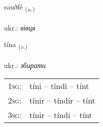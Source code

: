 \documentclass[frontgrid, backgrid]{flacards}\usepackage[]{graphicx}\usepackage[]{xcolor}
\begin{document}
\renewcommand{\flhead}{\vskip5pt \fboxsep=0pt {\small\bfseries\footnotesize Nafnorð | іменник}}
\renewcommand{\fcfoot}{\vskip5pt \fboxsep=0pt \hspace{2pt}{\small\bfseries\footnotesize 3K}}

\renewcommand{\blhead}{\vskip5pt {\small\bfseries\footnotesize Nafnorð | іменник }}
\renewcommand{\bcfoot}{\vskip5pt \hspace{2pt}{\small\bfseries\footnotesize 3K}}


{sauðfé \small{\textsubscript{(\textit{n.})}} \\[1ex] %
\textphonetic{[sœiðfjɛ]} \\
ukr.: \emph{вівця} \\  [2ex]
\renewcommand*{\arraystretch}{0.8}
}

\renewcommand{\flhead}{\vskip5pt \fboxsep=0pt {\small\bfseries\footnotesize Sagnorð | дієслово}}
\renewcommand{\fcfoot}{\vskip5pt \fboxsep=0pt \hspace{2pt}{\small\bfseries\footnotesize 3K}}

\renewcommand{\blhead}{\vskip5pt {\small\bfseries\footnotesize Sagnorð | дієслово }}
\renewcommand{\bcfoot}{\vskip5pt \hspace{2pt}{\small\bfseries\footnotesize 3K}}


{tína \small{\textsubscript{(\textit{v.})}} \\[1ex] %
\textphonetic{[tʰiːna]} \\
ukr.: \emph{збирати} \\  [2ex]
\renewcommand*{\arraystretch}{0.8}
\begin{tabular}{p{1cm}l}
\textsc{1sg}: & tíni -- tíndi -- tínt \\ 
\textsc{2sg}: & tínir -- tíndir -- tínt \\ 
\textsc{3sg}: & tínir -- tíndi -- tínt \\ 
\end{tabular}
}
\end{document}
